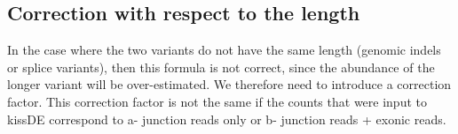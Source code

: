 \documentclass[english, a4paper, 12pt]{article}
\begin{document}
\subsection{Correction with respect to the length}
In the case where the two variants do not have the same length (genomic indels or splice variants), then this formula is not correct, since the abundance of the longer variant will be over-estimated. We therefore need to introduce a correction factor.
This correction factor is not the same if the counts that were input to kissDE correspond to a- junction reads only or b- junction reads + exonic reads.
\end{document}
